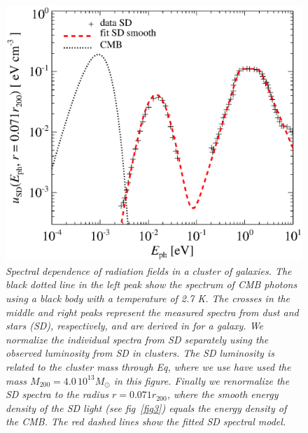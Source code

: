 \documentclass[10pt,aps,pra,reprint,amsmath,amsfonts,amssymb,showpacs]{revtex4-1}
\newcommand{\msun}{{M_\odot}}
\newcommand{\rvir}{r_{200}}
\newcommand{\mvir}{M_{200}}
\begin{document}
\begin{figure}%
 \includegraphics[width=0.99\columnwidth]{figures/fit.porter.v2.eps}
\caption{\it Spectral dependence of radiation fields in a cluster of
  galaxies. The black dotted line in the left peak show the spectrum
  of CMB photons using a black body with a temperature of 2.7 K. The
  crosses in the middle and right peaks represent the measured spectra
  from dust and stars (SD), respectively, and are derived in
  \cite{2006ApJ...648L..29P} for a galaxy. We normalize the individual
  spectra from SD separately using the observed luminosity from SD in
  clusters. The SD luminosity is related to the cluster mass through
  Eq, where we use have used the mass $\mvir=4.0\,10^{13}\msun$ in this
  figure. Finally we renormalize the SD spectra to the radius
  $r=0.071\rvir$, where the smooth energy density of the SD light (see
  fig~\ref{fig3}) equals the energy density of the CMB. The red dashed
  lines show the fitted SD spectral model.}
 \label{fig4}
\end{figure}
\end{document}
